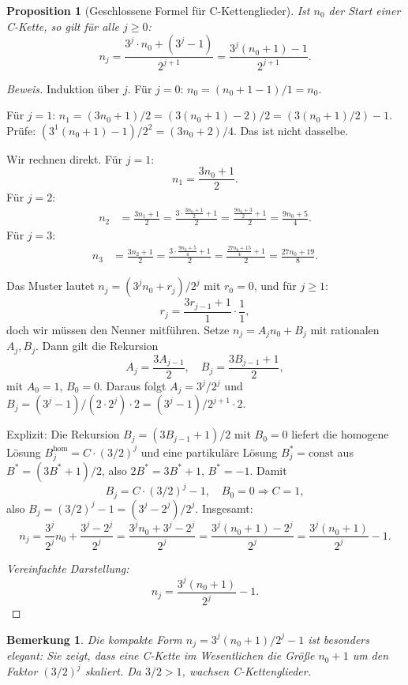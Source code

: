 \documentclass[12pt,a4paper]{article}
\newtheorem{proposition}[definition]{Proposition}
\newtheorem{bemerkung}[definition]{Bemerkung}
\newenvironment{beweis}{\begin{proof}[Beweis]}{\end{proof}}
\begin{document}
\begin{proposition}[Geschlossene Formel für C-Kettenglieder]
\label{prop:formel}
Ist $n_0$ der Start einer C-Kette, so gilt für alle $j \geq 0$:
\[
  n_j = \frac{3^j \cdot n_0 + (3^j - 1)}{2^{j+1}}
      = \frac{3^j(n_0 + 1) - 1}{2^{j+1}}.
\]
\end{proposition}

\begin{beweis}
Induktion über $j$. Für $j=0$: $n_0 = (n_0+1-1)/1 = n_0$. \checkmark

Für $j=1$: $n_1 = (3n_0+1)/2 = (3(n_0+1)-2)/2 = (3(n_0+1)/2) - 1$.
Prüfe: $(3^1(n_0+1)-1)/2^2 = (3n_0+2)/4$. Das ist nicht dasselbe.

Wir rechnen direkt. Für $j=1$:
\[
  n_1 = \frac{3n_0+1}{2}.
\]
Für $j=2$:
\begin{align*}
  n_2 &= \frac{3n_1+1}{2} = \frac{3 \cdot \frac{3n_0+1}{2}+1}{2}
       = \frac{\frac{9n_0+3}{2}+1}{2}
       = \frac{9n_0+5}{4}.
\end{align*}
Für $j=3$:
\begin{align*}
  n_3 &= \frac{3n_2+1}{2} = \frac{3 \cdot \frac{9n_0+5}{4}+1}{2}
       = \frac{\frac{27n_0+15}{4}+1}{2}
       = \frac{27n_0+19}{8}.
\end{align*}

Das Muster lautet $n_j = (3^j n_0 + r_j)/2^j$ mit $r_0=0$, und für $j\geq 1$:
\[
  r_j = \frac{3r_{j-1}+1}{1} \cdot \frac{1}{1},
\]
doch wir müssen den Nenner mitführen. Setze $n_j = A_j n_0 + B_j$ mit
rationalen $A_j, B_j$. Dann gilt die Rekursion
\[
  A_j = \frac{3A_{j-1}}{2},\quad B_j = \frac{3B_{j-1}+1}{2},
\]
mit $A_0 = 1$, $B_0 = 0$. Daraus folgt $A_j = 3^j/2^j$ und
$B_j = (3^j - 1)/(2 \cdot 2^j) \cdot 2 = (3^j-1)/2^{j+1} \cdot 2$.

Explizit: Die Rekursion $B_j = (3B_{j-1}+1)/2$ mit $B_0 = 0$ liefert die
homogene Lösung $B_j^{\mathrm{hom}} = C \cdot (3/2)^j$ und eine
partikuläre Lösung $B_j^* = \text{const}$ aus $B^* = (3B^*+1)/2$, also
$2B^* = 3B^*+1$, $B^* = -1$. Damit
\[
  B_j = C \cdot (3/2)^j - 1, \quad B_0 = 0 \Rightarrow C = 1,
\]
also $B_j = (3/2)^j - 1 = (3^j - 2^j)/2^j$. Insgesamt:
\[
  n_j = \frac{3^j}{2^j} n_0 + \frac{3^j - 2^j}{2^j}
       = \frac{3^j n_0 + 3^j - 2^j}{2^j}
       = \frac{3^j(n_0+1) - 2^j}{2^j}
       = \frac{3^j(n_0+1)}{2^j} - 1.
\]

\textit{Vereinfachte Darstellung:}
\[
  \boxed{n_j = \frac{3^j(n_0+1)}{2^j} - 1.}
\]
\end{beweis}

\begin{bemerkung}
Die kompakte Form $n_j = 3^j(n_0+1)/2^j - 1$ ist besonders elegant:
Sie zeigt, dass eine C-Kette im Wesentlichen die Größe $n_0+1$ um den
Faktor $(3/2)^j$ skaliert. Da $3/2 > 1$, wachsen C-Kettenglieder.
\end{bemerkung}
\end{document}
